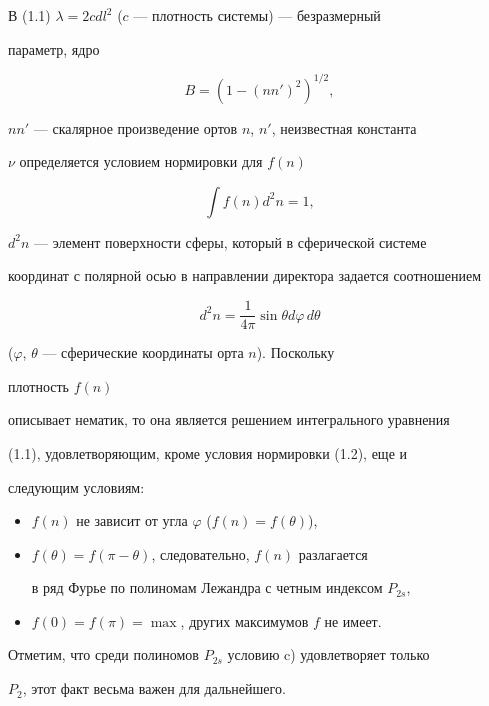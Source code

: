 В (1.1) $\lambda=2cdl^2$ ($c$ --- плотность системы) --- безразмерный


параметр, ядро


$$


B=(1-(nn')^2)^{1/2},


$$


$nn'$ --- скалярное произведение ортов $n$, $n'$, неизвестная константа


$\nu$ определяется условием нормировки для $f(n)$


\begin{equation}


\int f(n)d^2n=1,


\tag{1.2}


\end{equation}


$d^2n$ --- элемент поверхности сферы, который в сферической системе


координат с полярной осью в направлении директора задается соотношением


$$


d^2n=\frac{1}{4\pi}\sin\theta d\varphi\, d\theta


$$


($\varphi$, $\theta$ --- сферические координаты орта $n$). Поскольку


плотность $f(n)$


описывает нематик, то она является решением интегрального уравнения


(1.1), удовлетворяющим, кроме условия нормировки (1.2), еще и


следующим условиям:


\begin{itemize}


\item[a)] $f(n)$ не зависит от угла $\varphi$ ($f(n)=f(\theta)$),


\item[b)] $f(\theta)=f(\pi-\theta)$, следовательно, $f(n)$ разлагается


в ряд Фурье по полиномам Лежандра с четным индексом $P_{2s}$,


\item[c)] $f(0)=f(\pi)=\max$, других максимумов $f$ не имеет.


\end{itemize}


Отметим, что среди полиномов $P_{2s}$ условию c) удовлетворяет только


$P_2$, этот факт весьма важен для дальнейшего.





